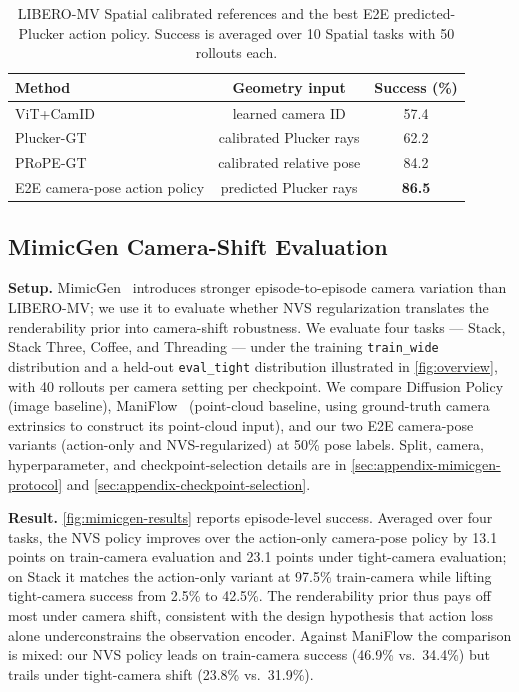 \begin{table}[t]
  \centering
  \caption{LIBERO-MV Spatial calibrated references and the best E2E
  predicted-Plucker action policy. Success is averaged over 10 Spatial tasks
  with 50 rollouts each.}
  \label{tab:libero}
  \begin{tabular}{lcc}
    \toprule
    Method & Geometry input & Success (\%) \\
    \midrule
    ViT+CamID & learned camera ID & 57.4 \\
    Plucker-GT & calibrated Plucker rays & 62.2 \\
    PRoPE-GT & calibrated relative pose & 84.2 \\
    E2E camera-pose action policy & predicted Plucker rays & \textbf{86.5} \\
    \bottomrule
  \end{tabular}
\end{table}

\subsection{MimicGen Camera-Shift Evaluation}

\textbf{Setup.} MimicGen~\citep{mandlekar2023mimicgen} introduces stronger episode-to-episode camera variation than LIBERO-MV; we use it to evaluate whether NVS regularization translates the renderability prior into camera-shift robustness. We evaluate four tasks --- Stack, Stack Three, Coffee, and Threading --- under the training \texttt{train\_wide} distribution and a held-out \texttt{eval\_tight} distribution illustrated in \autoref{fig:overview}, with 40 rollouts per camera setting per checkpoint. We compare Diffusion Policy~\citep{chi2023diffusionpolicy} (image baseline), ManiFlow~\citep{yan2025maniflow} (point-cloud baseline, using ground-truth camera extrinsics to construct its point-cloud input), and our two E2E camera-pose variants (action-only and NVS-regularized) at 50\% pose labels. Split, camera, hyperparameter, and checkpoint-selection details are in \autoref{sec:appendix-mimicgen-protocol} and \autoref{sec:appendix-checkpoint-selection}.

\textbf{Result.} \autoref{fig:mimicgen-results} reports episode-level success. Averaged over four tasks, the NVS policy improves over the action-only camera-pose policy by 13.1 points on train-camera evaluation and 23.1 points under tight-camera evaluation; on Stack it matches the action-only variant at 97.5\% train-camera while lifting tight-camera success from 2.5\% to 42.5\%. The renderability prior thus pays off most under camera shift, consistent with the design hypothesis that action loss alone underconstrains the observation encoder. Against ManiFlow the comparison is mixed: our NVS policy leads on train-camera success (46.9\% vs.\ 34.4\%) but trails under tight-camera shift (23.8\% vs.\ 31.9\%).

